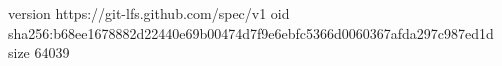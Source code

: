 version https://git-lfs.github.com/spec/v1
oid sha256:b68ee1678882d22440e69b00474d7f9e6ebfc5366d0060367afda297c987ed1d
size 64039
